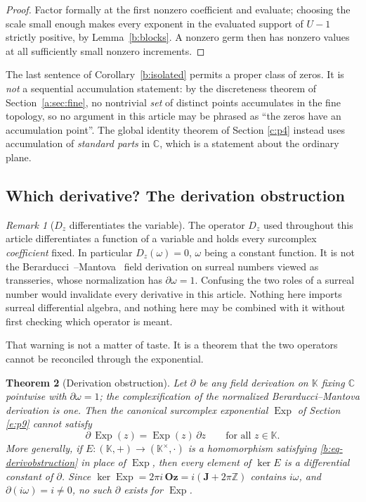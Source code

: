 \documentclass[11pt,a4paper]{article}
\numberwithin{equation}{section}
\newtheorem{theorem}{Theorem}[section]
\theoremstyle{definition}
\theoremstyle{remark}
\newtheorem{remark}[theorem]{Remark}
\theoremstyle{plain}
\newcommand{\K}{\mathbb K}
\newcommand{\Oz}{\mathbf{Oz}}
\newcommand{\Jpi}{\mathbf J}
\newcommand{\CC}{\mathbb C}
\newcommand{\ZZ}{\mathbb Z}
\DeclareMathOperator{\Exp}{Exp}
\begin{document}
\begin{proof}
Factor formally at the first nonzero coefficient and evaluate; choosing
the scale small enough makes every exponent in the evaluated support of
$U-1$ strictly positive, by Lemma~\ref{b:blocks}. A nonzero germ then has
nonzero values at all sufficiently small nonzero increments.
\end{proof}

The last sentence of Corollary~\ref{b:isolated} permits a proper class of
zeros. It is \emph{not} a sequential accumulation statement: by the
discreteness theorem of Section~\ref{a:sec:fine}, no nontrivial \emph{set} of
distinct points accumulates in the fine topology, so no argument in this
article may be phrased as ``the zeros have an accumulation point''. The
global identity theorem of Section \ref{c:p4} instead uses accumulation of
\emph{standard parts} in $\CC$, which is a statement about the ordinary
plane.

\subsection{Which derivative? The derivation obstruction}

\begin{remark}[$D_z$ differentiates the variable]
\label{b:Dz}
The operator $D_z$ used throughout this article differentiates a function
of a variable and holds every surcomplex \emph{coefficient} fixed. In
particular $D_z(\omega)=0$, $\omega$ being a constant function. It is not
the Berarducci~\cite{BMder}--Mantova~\cite{Mantova2026b} field derivation on surreal numbers viewed as
transseries, whose normalization has $\partial\omega=1$. Confusing the two
roles of a surreal number would invalidate every derivative in this
article. Nothing here imports surreal differential algebra, and nothing
here may be combined with it without first checking which operator is
meant.
\end{remark}

That warning is not a matter of taste. It is a theorem that the two
operators cannot be reconciled through the exponential.

\begin{theorem}[Derivation obstruction]
\label{b:derivation-obstruction}
Let $\partial$ be any field derivation on $\K$ fixing $\CC$ pointwise with
$\partial\omega=1$; the complexification of the normalized
Berarducci--Mantova derivation is one. Then the canonical surcomplex
exponential $\Exp$ of Section \ref{e:p9} cannot satisfy
\begin{equation}
\label{b:eq-derivobstruction}
 \partial\,\Exp(z)=\Exp(z)\,\partial z\qquad\text{for all }z\in\K .
\end{equation}
More generally, if $E:(\K,+)\to(\K^{\times},\cdot)$ is a homomorphism
satisfying \eqref{b:eq-derivobstruction} in place of $\Exp$, then every
element of $\ker E$ is a differential constant of $\partial$. Since
$\ker\Exp=2\pi i\,\Oz=i(\Jpi+2\pi\ZZ)$ contains $i\omega$, and
$\partial(i\omega)=i\ne0$, no such $\partial$ exists for $\Exp$.
\end{theorem}
\end{document}
